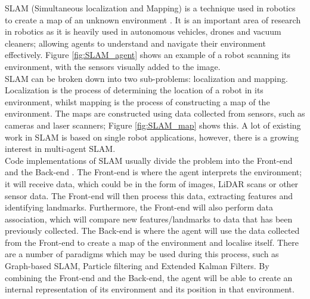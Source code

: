 \documentclass[12pt]{article}
\begin{document}
SLAM (Simultaneous localization and Mapping) is a technique used in robotics to create a map of an unknown environment \cite{SLAM_overview}.
It is an important area of research in robotics as it is heavily used in autonomous vehicles, drones and vacuum cleaners;
allowing agents to understand and navigate their environment effectively. Figure \ref{fig:SLAM_agent} shows an example of a
robot scanning its environment, with the sensors visually added to the image.\\
SLAM can be broken down into two sub-problems: localization and mapping. Localization is the process of determining the
location of a robot in its environment, whilst mapping is the process of constructing a map of the environment. The maps
are constructed using data collected from sensors, such as cameras and laser scanners; Figure \ref{fig:SLAM_map} shows this.
A lot of existing work in SLAM is based on single robot applications, however, there is a growing interest in multi-agent
SLAM.\\
Code implementations of SLAM usually divide the problem into the Front-end and the Back-end \cite{SLAM_components}.
The Front-end is where the agent interprets the environment; it will receive data, which could be in the form of images,
LiDAR scans or other sensor data. The Front-end will then process this data, extracting features and identifying landmarks.
Furthermore, the Front-end will also perform data association, which will compare new features/landmarks to data that has
been previously collected. The Back-end is where the agent will use the data collected from the Front-end to create a map
of the environment and localise itself. There are a number of paradigms which may be used during this process, such as Graph-based
SLAM, Particle filtering and Extended Kalman Filters. By combining the Front-end and the Back-end, the agent will be able to
create an internal representation of its environment and its position in that environment.
\end{document}
